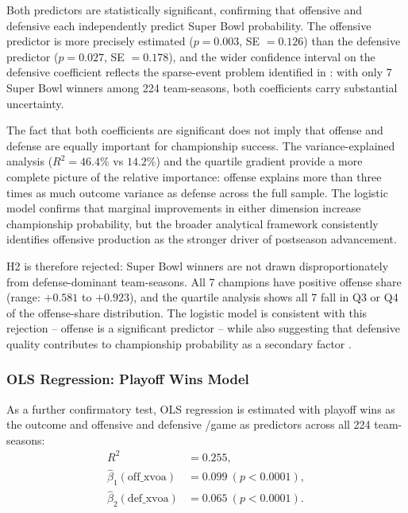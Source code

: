 Both predictors are statistically significant, confirming that offensive and
defensive \xvoa{} each independently predict Super Bowl probability. The
offensive predictor is more precisely estimated ($p = 0.003$, SE $= 0.126$)
than the defensive predictor ($p = 0.027$, SE $= 0.178$), and the wider
confidence interval on the defensive coefficient reflects the
sparse-event problem identified in : with only 7 Super
Bowl winners among 224 team-seasons, both coefficients carry substantial
uncertainty.

The fact that both coefficients are significant does not imply that offense and
defense are equally important for championship success. The variance-explained
analysis ($R^2 = 46.4\%$ vs $14.2\%$) and the quartile gradient provide a
more complete picture of the relative importance: offense explains more than
three times as much outcome variance as defense across the full sample.
The logistic model confirms that marginal improvements in either dimension
increase championship probability, but the broader analytical framework
consistently identifies offensive production as the stronger driver of
postseason advancement.

H2 is therefore rejected: Super Bowl winners are not drawn
disproportionately from defense-dominant team-seasons. All 7 champions have
positive offense share (range: $+0.581$ to $+0.923$), and the quartile
analysis shows all 7 fall in Q3 or Q4 of the offense-share distribution.
The logistic model is consistent with this rejection -- offense is a significant
predictor -- while also suggesting that defensive quality contributes to
championship probability as a secondary factor
\parencite{hosmer2013logistic}.

\subsubsection{OLS Regression: Playoff Wins Model}

As a further confirmatory test, OLS regression is estimated with
playoff wins as the outcome and offensive and defensive \xvoa{}/game
as predictors across all 224 team-seasons:
\begin{align*}
  R^2 &= 0.255, \\
  \hat{\beta}_1(\text{off\_xvoa}) &= 0.099 \ (p < 0.0001), \\
  \hat{\beta}_2(\text{def\_xvoa}) &= 0.065 \ (p < 0.0001).
\end{align*}

